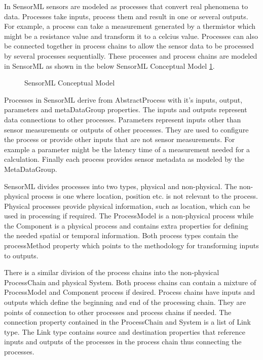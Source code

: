 \documentclass[]{final_report}
\begin{document}
In SensorML sensors are modeled as processes that convert real phenomena to data. Processes take inputs, process them and result in one or several outputs. For example, a process can take a measurement generated by a thermistor which might be a resistance value and transform it to a celcius value. Processes can also be connected together in process chains to allow the sensor data to be processed by several processes sequentially. These processes and process chains are modeled in SensorML as shown in the  below SensorML Conceptual Model \ref{fig:SMLConceptualModel}.

\begin{figure}[h]
\caption{SensorML Conceptual Model}\label{fig:SMLConceptualModel}
\end{figure}

Processes in SensorML derive from AbstractProcess with it's inputs, output, parameters and metaDataGroup properties. The inputs and outputs represent data connections to other processes. Parameters represent inputs other than sensor measurements or outputs of other processes. They are used to configure the process or provide other inputs that are not sensor measurements. For example a parameter might be the latency time of a measurement needed for a calculation. Finally each process provides sensor metadata as modeled by the MetaDataGroup.

SensorML divides processes into two types, physical and non-physical. The non-physical process is one where  location, position etc. is not relevant to the process. Physical processes provide physical information, such as location, which can be used in processing if required. The ProcessModel is a non-physical process while the Component is a physical process and contains extra properties for defining the needed spatial or temporal information. Both process types contain the processMethod property which points to the methodology for transforming inputs to outputs.

There is a similar division of the process chains into the non-physical ProcessChain and physical System. Both process chains can contain a mixture of ProcessModel and Component process if desired. Process chains have inputs and outputs which define the beginning and end of the processing chain. They are points of connection to other processes and process chains if needed. The connection property contained in the ProcessChain and System is a list of Link type. The Link type contains source and destination properties that reference inputs and outputs of the processes in the process chain thus connecting the processes. 
\end{document}
